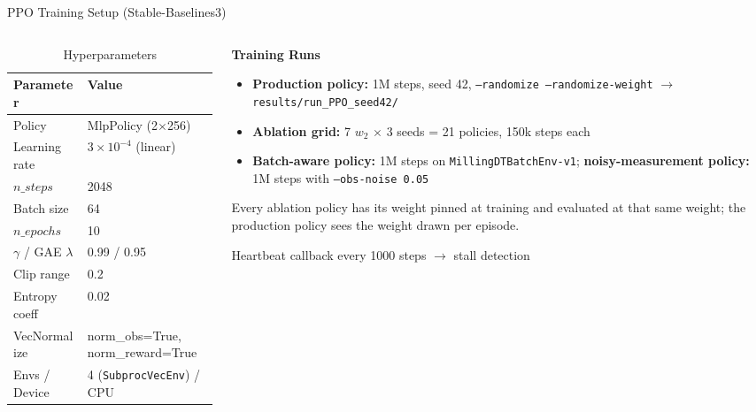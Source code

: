 ﻿\documentclass[11pt,aspectratio=169]{beamer}
\begin{document}
\begin{frame}{PPO Training Setup (Stable-Baselines3)}
    \begin{columns}[T]
        \begin{column}{0.5\textwidth}
            \begin{table}
            \centering
            \scriptsize
            \caption{Hyperparameters}
            \begin{tabular}{@{}ll@{}}
            \toprule
            \textbf{Parameter} & \textbf{Value} \\
            \midrule
            Policy & MlpPolicy (2$\times$256) \\
            Learning rate & $3\times10^{-4}$ (linear) \\
            $n\_steps$ & 2048 \\
            Batch size & 64 \\
            $n\_epochs$ & 10 \\
            $\gamma$ / GAE $\lambda$ & 0.99 / 0.95 \\
            Clip range & 0.2 \\
            Entropy coeff & 0.02 \\
            VecNormalize & norm\_obs=True, norm\_reward=True \\
            Envs / Device & 4 (\texttt{SubprocVecEnv}) / CPU \\
            \bottomrule
            \end{tabular}
            \end{table}
        \end{column}
        \begin{column}{0.5\textwidth}
            \textbf{Training Runs}
            \begin{itemize}
                \item \textbf{Production policy:} 1M steps, seed 42,
                      \texttt{--randomize --randomize-weight}
                      $\to$ \texttt{results/run\_PPO\_seed42/}
                \item \textbf{Ablation grid:} 7 $w_2$ $\times$ 3 seeds = 21 policies,
                      150k steps each
                \item \textbf{Batch-aware policy:} 1M steps on
                      \texttt{MillingDTBatchEnv-v1}; \textbf{noisy-measurement policy:}
                      1M steps with \texttt{--obs-noise 0.05}
            \end{itemize}

            \vspace{0.3em}
            \footnotesize
            Every ablation policy has its weight \alert{pinned} at training and evaluated at that
            same weight; the production policy sees the weight drawn per episode.

            \vspace{0.4em}
            \alert{Heartbeat callback} every 1000 steps $\to$ stall detection
        \end{column}
    \end{columns}
\end{frame}
\end{document}
